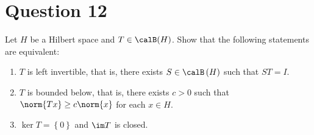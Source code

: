 \section{Question 12}
\horz

Let $H$ be a Hilbert space and $T \in \calB (H)$. Show that the following statements are equivalent:
\begin{enumerate}[label=(\roman*)]
    \item $T$ is left invertible, that is, there exists $S\in \calB \left( H \right)$ such that $ST=I$.
    \item $T$ is bounded below, that is, there exists $c> 0$ such that $\norm{Tx}\ge c\norm{x}$ for each $x\in H$.
    \item $\ker T =\left\{ 0 \right\}$ and $\im T$ is closed.
\end{enumerate}


